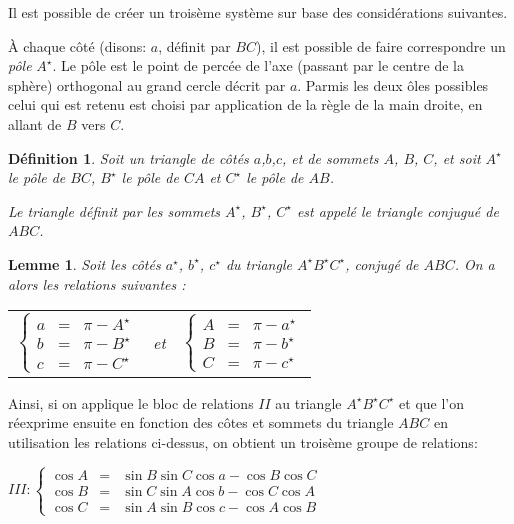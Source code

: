 \documentclass[12pt]{report}
\newtheorem{lemma}{Lemme}
\newtheorem{definition}{Définition}
\begin{document}
\bigskip
Il est possible de créer un troisème système sur base des considérations suivantes. 

À chaque côté (disons: $a$, définit par $BC$), il est possible de faire correspondre un \emph{pôle} $A^\star$. Le pôle est le point de percée de l'axe (passant par le centre de la sphère) orthogonal au grand cercle décrit par $a$. Parmis les deux ôles possibles celui qui est retenu est choisi par application de la règle de la main droite, en allant de $B$ vers $C$. 

\begin{definition}
Soit un triangle de côtés $a$,$b$,$c$, et de sommets $A$, $B$, $C$, et soit 
$A^\star$ le pôle de $BC$, 
$B^\star$ le pôle de $CA$ et
$C^\star$ le pôle de $AB$.

Le triangle définit par les sommets $A^\star$, $B^\star$, $C^\star$ est appelé le triangle conjugué de $ABC$.
\end{definition}

\begin{lemma}
Soit les côtés $a^\star$, $b^\star$, $c^\star$ du triangle $A^\star B^\star C^\star$, conjugé de $ABC$. 
On a alors les relations suivantes :

\begin{tabular}{m{} c  m{}}
\begin{equation*}
\left\{ \begin{split}
 a &=& \pi - A^\star \\
 b &=& \pi - B^\star \\
 c &=& \pi - C^\star
 \end{split}
 \right. 
 \end{equation*} & et & 
\begin{equation}
\left\{ 
\begin{split}
 A &=& \pi - a^\star \\
 B &=& \pi - b^\star \\
 C &=& \pi - c^\star
 \end{split}
 \right. 
 \end{equation} \label{eq:conj} \end{tabular}
\end{lemma}

Ainsi, si on applique le bloc de relations $II$  au triangle $A^\star B^\star C^\star $ et que l'on réexprime
ensuite en fonction des côtes et sommets du triangle $ABC$ en utilisation les relations
ci-dessus, on obtient un troisème groupe de relations:

\bigskip
$III: \left\{ \begin{array}{lll} 
\cos A &=& \sin B \sin C \cos a- \cos B \cos C \\
\cos B &=& \sin C \sin A \cos b- \cos C \cos A \\
\cos C &=& \sin A \sin B \cos c- \cos A \cos B  \end{array} \right.
$
\end{document}

